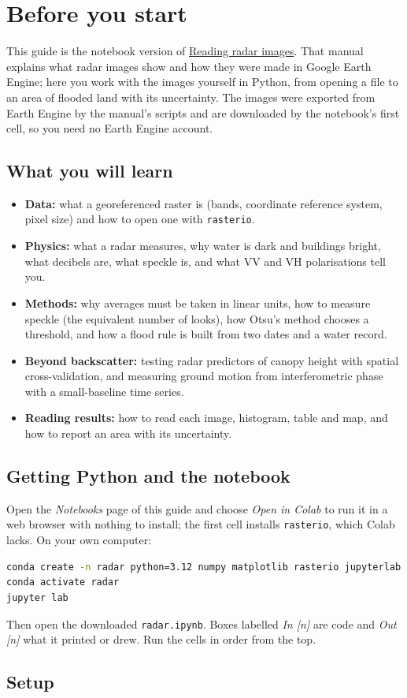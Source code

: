 \chapter{Before you start}\label{ch:start}

This guide is the notebook version of \href{https://ahmadammar.github.io/teaching/sar/}{Reading radar images}. That manual explains what radar images show and how they were made in Google Earth Engine; here you work with the images yourself in Python, from opening a file to an area of flooded land with its uncertainty. The images were exported from Earth Engine by the manual's scripts and are downloaded by the notebook's first cell, so you need no Earth Engine account.

\section{What you will learn}
\begin{itemize}
\item \textbf{Data:} what a georeferenced raster is (bands, coordinate reference system, pixel size) and how to open one with \texttt{rasterio}.
\item \textbf{Physics:} what a radar measures, why water is dark and buildings bright, what decibels are, what speckle is, and what VV and VH polarisations tell you.
\item \textbf{Methods:} why averages must be taken in linear units, how to measure speckle (the equivalent number of looks), how Otsu's method chooses a threshold, and how a flood rule is built from two dates and a water record.
\item \textbf{Beyond backscatter:} testing radar predictors of canopy height with spatial cross-validation, and measuring ground motion from interferometric phase with a small-baseline time series.
\item \textbf{Reading results:} how to read each image, histogram, table and map, and how to report an area with its uncertainty.
\end{itemize}

\section{Getting Python and the notebook}
Open the \emph{Notebooks} page of this guide and choose \emph{Open in Colab} to run it in a web browser with nothing to install; the first cell installs \texttt{rasterio}, which Colab lacks. On your own computer:
\begin{lstlisting}[language=bash]
conda create -n radar python=3.12 numpy matplotlib rasterio jupyterlab
conda activate radar
jupyter lab
\end{lstlisting}
Then open the downloaded \texttt{radar.ipynb}. Boxes labelled \emph{In [n]} are code and \emph{Out [n]} what it printed or drew. Run the cells in order from the top.

\section{Setup}


